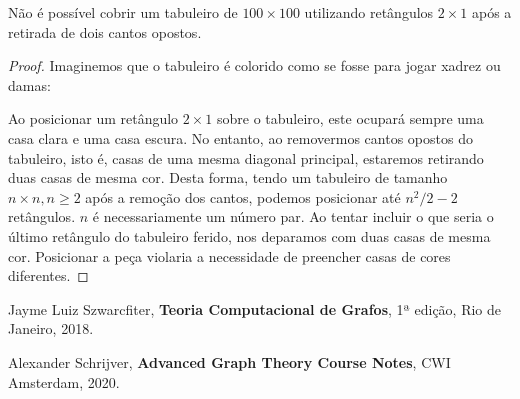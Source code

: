 \documentclass{homework}
\begin{document}
	\quest %
	
	\begin{supposition}
		Não é possível cobrir um tabuleiro de $100 \times 100$ utilizando retângulos $2 \times 1$ após a retirada de dois cantos opostos.
	\end{supposition}

	\begin{proof}
		Imaginemos que o tabuleiro é colorido como se fosse para jogar xadrez ou damas:
		\begin{fig}
			
		\end{fig}
		Ao posicionar um retângulo $2 \times 1$ sobre o tabuleiro, este ocupará sempre uma casa clara e uma casa escura. No entanto, ao removermos cantos opostos do tabuleiro, isto é, casas de uma mesma diagonal principal, estaremos retirando duas casas de mesma cor. Desta forma, tendo um tabuleiro de tamanho $n \times n, n \ge 2$ após a remoção dos cantos, podemos posicionar até $n^2 / 2 - 2$ retângulos. $n$ é necessariamente um número par. Ao tentar incluir o que seria o último retângulo do tabuleiro ferido, nos deparamos com duas casas de mesma cor. Posicionar a peça violaria a necessidade de preencher casas de cores diferentes.
	\end{proof}
	
	\begin{thebibliography}{10}
		 Jayme Luiz Szwarcfiter, \textbf{Teoria Computacional de Grafos}, 1ª edição, Rio de Janeiro, 2018.
		
		 Alexander Schrijver, \textbf{Advanced Graph Theory Course Notes}, CWI Amsterdam, 2020.
	\end{thebibliography} 
\end{document}
